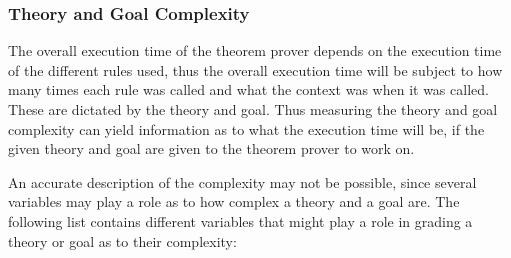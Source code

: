 \documentclass[11pt,twoside,a4paper]{report}
\begin{document}
\subsubsection{Theory and Goal Complexity}
The overall execution time of the theorem prover depends on the execution time of the different rules used, thus the overall execution time will be subject to how many times each rule was called and what the context was when it was called. These are dictated by the theory and goal. Thus measuring the theory and goal complexity can yield information as to what the execution time will be, if the given theory and goal are given to the theorem prover to work on.

An accurate description of the complexity may not be possible, since several variables may play a role as to how complex a theory and a goal are. The following list contains different variables that might play a role in grading a theory or goal as to their complexity:
\end{document}
